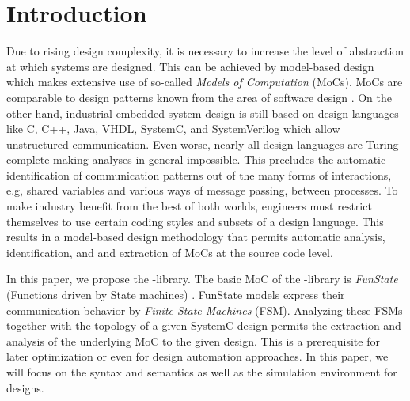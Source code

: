 \section{Introduction}\label{sec:intro}

Due to rising design complexity, it is necessary to increase the level of abstraction at which systems are designed.
This can be achieved by model-based design which makes extensive use of so-called \emph{Models of Computation} \cite{embsft:2002} (MoCs).
MoCs are comparable to design patterns known from the area of software design \cite{gamma:1995}.
On the other hand, industrial embedded system design is still based on design languages like C, C++, Java, VHDL, SystemC, and SystemVerilog which allow unstructured communication.
Even worse, nearly all design languages are Turing complete making analyses in general impossible.
This precludes the automatic identification of communication patterns out of the many forms of interactions, e.g, shared variables and various ways of message passing, between processes.
To make industry benefit from the best of both worlds, engineers must restrict themselves to use certain coding styles and subsets of a design language.
This results in a model-based design methodology that permits automatic analysis, identification, and and extraction of MoCs at the source code level.



In this paper, we propose the \SysteMoC{}-library.
The basic MoC of the \SysteMoC{}-library is \emph{FunState} (Functions driven by State machines) \cite{stgzet:2001}.
FunState models express their communication behavior by \emph{Finite State Machines} (FSM).
Analyzing these FSMs together with the topology of a given SystemC design permits the extraction and analysis of the underlying MoC to the given design.
This is a prerequisite for later optimization or even for design automation approaches.
In this paper, we will focus on the \SysteMoC{} syntax and semantics as well as the simulation environment for \SysteMoC{} designs.

